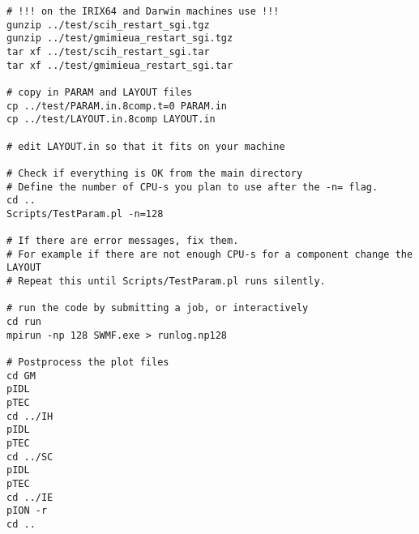 \begin{verbatim}
# !!! on the IRIX64 and Darwin machines use !!!
gunzip ../test/scih_restart_sgi.tgz
gunzip ../test/gmimieua_restart_sgi.tgz
tar xf ../test/scih_restart_sgi.tar
tar xf ../test/gmimieua_restart_sgi.tar

# copy in PARAM and LAYOUT files
cp ../test/PARAM.in.8comp.t=0 PARAM.in
cp ../test/LAYOUT.in.8comp LAYOUT.in

# edit LAYOUT.in so that it fits on your machine

# Check if everything is OK from the main directory
# Define the number of CPU-s you plan to use after the -n= flag.
cd ..
Scripts/TestParam.pl -n=128

# If there are error messages, fix them. 
# For example if there are not enough CPU-s for a component change the LAYOUT
# Repeat this until Scripts/TestParam.pl runs silently.

# run the code by submitting a job, or interactively
cd run
mpirun -np 128 SWMF.exe > runlog.np128

# Postprocess the plot files
cd GM
pIDL
pTEC
cd ../IH
pIDL
pTEC
cd ../SC
pIDL
pTEC
cd ../IE
pION -r
cd ..

\end{verbatim}
